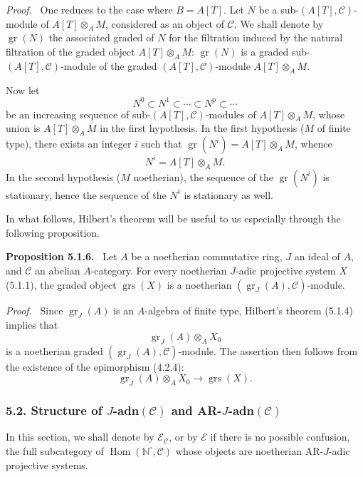 \documentclass[11pt]{article}
\newenvironment{statement}[1]{\par\medskip\noindent\textbf{#1.}\ }{\par\medskip}
\newenvironment{prooftext}[1][Proof]{\par\noindent\emph{#1.}\ }{\par\medskip}
\DeclareMathOperator{\Hom}{Hom}
\providecommand{\gr}{\operatorname{gr}}
\providecommand{\Hom}{\operatorname{Hom}}
\providecommand{\gr}{\operatorname{gr}}
\providecommand{\gr}{\operatorname{gr}}
\providecommand{\grs}{\operatorname{grs}}
\providecommand{\Hom}{\operatorname{Hom}}
\begin{document}
\begin{prooftext}
One reduces to the case where \(B=A[T]\). Let \(N\) be a sub-\((A[T],\mathcal C)\)-module of \(A[T]\otimes_A M\), considered as an object of \(\mathcal C\). We shall denote by \(\gr(N)\) the associated graded of \(N\) for the filtration induced by the natural filtration of the graded object \(A[T]\otimes_A M\): \(\gr(N)\) is a graded sub-\((A[T],\mathcal C)\)-module of the graded \((A[T],\mathcal C)\)-module \(A[T]\otimes_A M\).

Now let
\[
N^0\subset N^1\subset\cdots\subset N^p\subset\cdots
\]
be an increasing sequence of sub-\((A[T],\mathcal C)\)-modules of \(A[T]\otimes_A M\), whose union is \(A[T]\otimes_A M\) in the first hypothesis. In the first hypothesis (\(M\) of finite type), there exists an integer \(i\) such that \(\gr(N^i)=A[T]\otimes_A M\), whence
\[
N^i=A[T]\otimes_A M.
\]
In the second hypothesis (\(M\) noetherian), the sequence of the \(\gr(N^i)\) is stationary, hence the sequence of the \(N^i\) is stationary as well.

In what follows, Hilbert's theorem will be useful to us especially through the following proposition.
\end{prooftext}

\begin{statement}{Proposition 5.1.6}
Let \(A\) be a noetherian commutative ring, \(J\) an ideal of \(A\), and \(\mathcal C\) an abelian \(A\)-category. For every noetherian \(J\)-adic projective system \(X\) (5.1.1), the graded object \(\grs(X)\) is a noetherian \((\gr_J(A),\mathcal C)\)-module.
\end{statement}

\begin{prooftext}
Since \(\gr_J(A)\) is an \(A\)-algebra of finite type, Hilbert's theorem (5.1.4) implies that
\[
\gr_J(A)\otimes_A X_0
\]
is a noetherian graded \((\gr_J(A),\mathcal C)\)-module. The assertion then follows from the existence of the epimorphism (4.2.4):
\[
\gr_J(A)\otimes_A X_0\longrightarrow \grs(X).
\]
\end{prooftext}

\subsubsection*{5.2. Structure of \(J\)-adn\((\mathcal C)\) and AR-\(J\)-adn\((\mathcal C)\)}

In this section, we shall denote by \(\mathcal E_{\mathcal C}\), or by \(\mathcal E\) if there is no possible confusion, the full subcategory of \(\Hom(\mathbb N^\circ,\mathcal C)\) whose objects are noetherian AR-\(J\)-adic projective systems.
\end{document}
